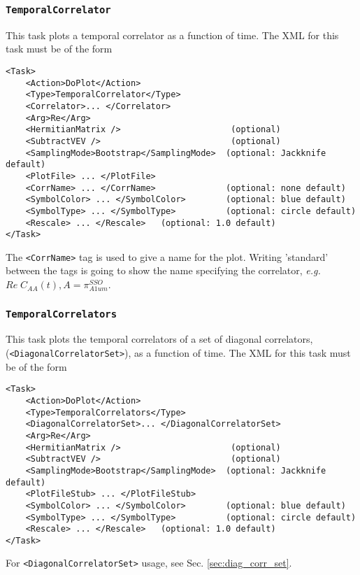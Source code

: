 \documentclass[12pt]{article}
\newcommand{\vb}{\texttt}
\begin{document}
\subsubsection{\vb{TemporalCorrelator}}

This task plots a temporal correlator as a function of time. The XML for this task must be of the form
\begin{verbatim}
<Task>
    <Action>DoPlot</Action>
    <Type>TemporalCorrelator</Type>
    <Correlator>... </Correlator>
    <Arg>Re</Arg>
    <HermitianMatrix />                      (optional)
    <SubtractVEV />                          (optional)
    <SamplingMode>Bootstrap</SamplingMode>  (optional: Jackknife default)
    <PlotFile> ... </PlotFile>
    <CorrName> ... </CorrName>              (optional: none default)
    <SymbolColor> ... </SymbolColor>        (optional: blue default)
    <SymbolType> ... </SymbolType>          (optional: circle default)
    <Rescale> ... </Rescale>   (optional: 1.0 default)
</Task>
\end{verbatim}
The \vb{<CorrName>} tag is used to give a name for the plot.
Writing 'standard' between the tags is going to show the name specifying the correlator,
\textit{e.g.} $Re \; C_{AA}(t), A = \pi_{A1um}^{SSO}$.

\subsubsection{\vb{TemporalCorrelators}}
This task plots the temporal correlators of a set of diagonal correlators, (\vb{<DiagonalCorrelatorSet>}),
as a function of time. The XML for this task must be of the form
\begin{verbatim}
<Task>
    <Action>DoPlot</Action>
    <Type>TemporalCorrelators</Type>
    <DiagonalCorrelatorSet>... </DiagonalCorrelatorSet>
    <Arg>Re</Arg>
    <HermitianMatrix />                      (optional)
    <SubtractVEV />                          (optional)
    <SamplingMode>Bootstrap</SamplingMode>  (optional: Jackknife default)
    <PlotFileStub> ... </PlotFileStub>
    <SymbolColor> ... </SymbolColor>        (optional: blue default)
    <SymbolType> ... </SymbolType>          (optional: circle default)
    <Rescale> ... </Rescale>   (optional: 1.0 default)
</Task>
\end{verbatim}
For \vb{<DiagonalCorrelatorSet>} usage, see Sec. \ref{sec:diag_corr_set}.
\end{document}
